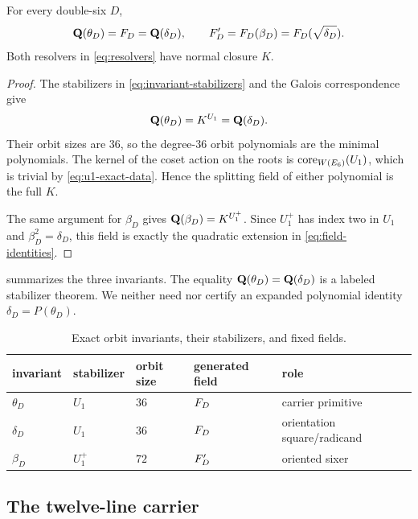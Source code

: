 \begin{theorem}
\label{thm:configuration-fields}
For every double-six \(D\),
\begin{equation}
 \mathbf Q(\theta_D)=F_D=\mathbf Q(\delta_D),
 \qquad
 F_D'=F_D(\beta_D)=F_D(\sqrt{\delta_D}).
\label{eq:field-identities}
\end{equation}
Both resolvers in \cref{eq:resolvers} have normal closure \(K\).
\end{theorem}

\begin{proof}
The stabilizers in \cref{eq:invariant-stabilizers} and the Galois
correspondence give
\[
 \mathbf Q(\theta_D)=K^{U_1}=\mathbf Q(\delta_D).
\]
Their orbit sizes are \(36\), so the degree-\(36\) orbit polynomials are the
minimal polynomials.  The kernel of the coset action on the roots is
\(\operatorname{core}_{W(E_6)}(U_1)\), which is trivial by
\cref{eq:u1-exact-data}.  Hence the splitting field of either polynomial is
the full \(K\).

The same argument for \(\beta_D\) gives
\(\mathbf Q(\beta_D)=K^{U_1^+}\).  Since \(U_1^+\) has index two in \(U_1\) and
\(\beta_D^2=\delta_D\), this field is exactly the quadratic extension in
\cref{eq:field-identities}.
\end{proof}

 summarizes the three invariants.  The equality
\(\mathbf Q(\theta_D)=\mathbf Q(\delta_D)\) is a labeled stabilizer theorem.  We neither
need nor certify an expanded polynomial identity
\(\delta_D=P(\theta_D)\).

\begin{table}[t]
\centering
\small
\begin{tabular}{@{}lllll@{}}
\toprule
invariant & stabilizer & orbit size & generated field & role\\
\midrule
\(\theta_D\) & \(U_1\) & \(36\) & \(F_D\) & carrier primitive\\
\(\delta_D\) & \(U_1\) & \(36\) & \(F_D\) & orientation square/radicand\\
\(\beta_D\) & \(U_1^+\) & \(72\) & \(F_D'\) & oriented sixer\\
\bottomrule
\end{tabular}
\caption{Exact orbit invariants, their stabilizers, and fixed fields.}
\label{tab:field-invariants}
\end{table}

\subsection{The twelve-line carrier}

